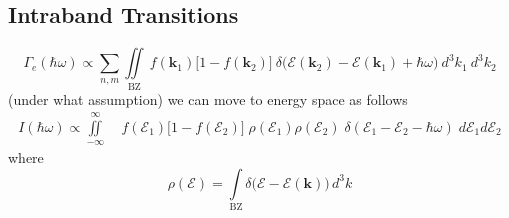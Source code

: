 \newpage
\subsection{Intraband Transitions}
\label{sec:theoretical_intraband_transitions}

\begin{equation}
\Gamma_{e}(\hbar\omega) \propto \sum_{n, m} \iint\limits_{\text{BZ}}  \ f(\mathbf{k}_{1})\Big[ 1-f(\mathbf{k}_{2})\Big]\ \delta\big(\mathcal{E}(\mathbf{k}_{2}) - \mathcal{E}(\mathbf{k}_{1}) + \hbar\omega \big) \ d^{3}k_{1} \ d^{3}k_{2}
\label{eq:theoretical_intraband_bz}
\end{equation}
(under what assumption) we can move to energy space as follows
\begin{align}
I(\hbar\omega) \propto \iint\limits_{-\infty}^{\infty}\;& f(\mathcal{E}_1) \Big[1-f(\mathcal{E}_2)\Big] \;  \rho(\mathcal{E}_{1})\rho (\mathcal{E}_{2} )\; \delta(\mathcal{E}_1 - \mathcal{E}_2 - \hbar\omega) \;  d\mathcal{E}_1 d\mathcal{E}_2
\label{eq:theoretical_intraband_energy}
\end{align}
where
\begin{equation}
\rho(\mathcal{E}) = \int\limits_{\text{BZ}} \delta\Big(\mathcal{E}-\mathcal{E}(\mathbf{k})\Big) \, d^{3}k 
\label{eq:theoretical_intraband_rho}
\end{equation}
